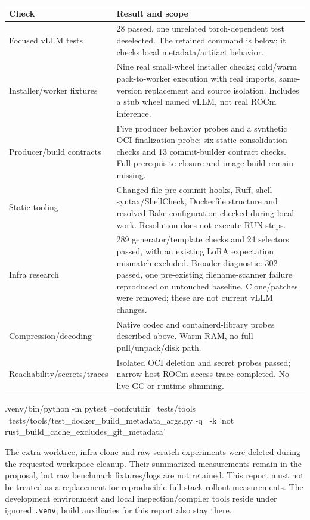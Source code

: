 \documentclass[11pt,a4paper]{article}
\newcommand{\file}[1]{\nolinkurl{#1}}
\begin{document}
\begin{longtable}{L{47mm}L{101mm}}
\toprule
Check & Result and scope \\
\midrule
\endhead
Focused vLLM tests & 28 passed, one unrelated torch-dependent test deselected.
The retained command is below; it checks local metadata/artifact behavior. \\
Installer/worker fixtures & Nine real small-wheel installer checks; cold/warm
pack-to-worker execution with real imports, same-version replacement and source
isolation. Includes a stub wheel named vLLM, not real ROCm inference. \\
Producer/build contracts & Five producer behavior probes and a synthetic OCI
finalization probe; six static consolidation checks and 13 commit-builder
contract checks. Full prerequisite closure and image build remain missing. \\
Static tooling & Changed-file pre-commit hooks, Ruff, shell syntax/ShellCheck,
Dockerfile structure and resolved Bake configuration checked during local work.
Resolution does not execute RUN steps. \\
Infra research & 289 generator/template checks and 24 selectors passed, with
an existing LoRA expectation mismatch excluded. Broader diagnostic: 302 passed,
one pre-existing filename-scanner failure reproduced on untouched baseline.
Clone/patches were removed; these are not current vLLM changes. \\
Compression/decoding & Native codec and containerd-library probes described
above. Warm RAM, no full pull/unpack/disk path. \\
Reachability/secrets/traces & Isolated OCI deletion and secret probes passed;
narrow host ROCm access trace completed. No live GC or runtime slimming. \\
\bottomrule
\end{longtable}

\begin{Code}
.venv/bin/python -m pytest --confcutdir=tests/tools \
  tests/tools/test_docker_build_metadata_args.py -q \
  -k 'not rust_build_cache_excludes_git_metadata'
\end{Code}

The extra worktree, infra clone and raw scratch experiments were deleted during
the requested workspace cleanup. Their summarized measurements remain in the
proposal, but raw benchmark fixtures/logs are not retained. This report must not
be treated as a replacement for reproducible full-stack rollout measurements.
The development environment and local inspection/compiler tools reside under
ignored \file{.venv}; build auxiliaries for this report also stay there.
\end{document}
